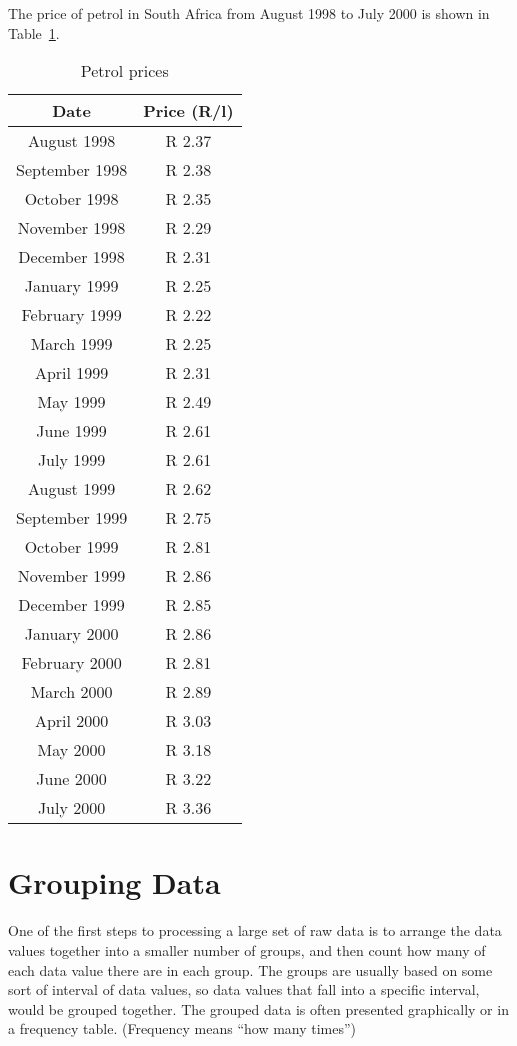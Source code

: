 \documentclass[10pt,a4paper,titlepage,twoside,openright]{report}
\begin{document}
The price of petrol in South Africa from August 1998 to July 2000 is shown in Table~\ref{tab:mdat:s:dataset5}.

\begin{table}[htb!]
\begin{center}
\caption{Petrol prices}
\label{tab:mdat:s:dataset5}
\begin{tabular}{|c|c|}\hline
Date & Price (R/l)\\\hline\hline
August 1998 & R 2.37\\\hline
September 1998 & R 2.38\\\hline
October 1998 & R 2.35\\\hline
November 1998 & R 2.29\\\hline
December 1998 & R 2.31\\\hline
January 1999 & R 2.25\\\hline
February 1999 & R 2.22\\\hline
March 1999 & R 2.25\\\hline
April 1999 & R 2.31\\\hline
May 1999 & R 2.49\\\hline
June 1999 & R 2.61\\\hline
July 1999 & R 2.61\\\hline
August 1999 & R 2.62\\\hline
September 1999 & R 2.75\\\hline
October 1999 & R 2.81\\\hline
November 1999 & R 2.86\\\hline
December 1999 & R 2.85\\\hline
January 2000 & R 2.86\\\hline
February 2000 & R 2.81\\\hline
March 2000 & R 2.89\\\hline
April 2000 & R 3.03\\\hline
May 2000 & R 3.18\\\hline
June 2000 & R 3.22\\\hline
July 2000 & R 3.36\\\hline
\end{tabular}
\end{center}
\end{table}

\section{Grouping Data}
One of the first steps to processing a large set of raw data is to arrange the data values together into a smaller number of groups, and then count how many of each data value there are in each group. The groups are usually based on some sort of interval of data values, so data values that fall into a specific interval, would be grouped together. The grouped data is often presented graphically or in a frequency table. (Frequency means ``how many times'')
\end{document}
